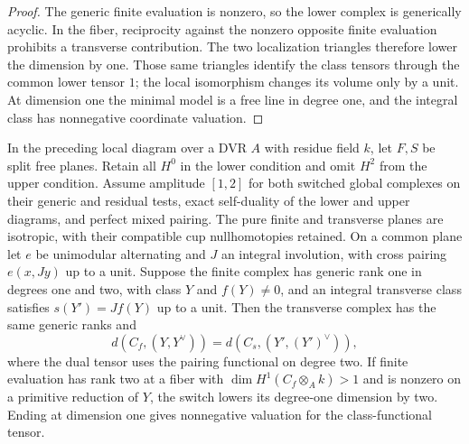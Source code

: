 \begin{proof}
The generic finite evaluation is nonzero, so the lower complex is
generically acyclic.  In the fiber, reciprocity against the nonzero
opposite finite evaluation prohibits a transverse contribution.
The two localization triangles therefore lower the dimension by one.
Those same triangles identify the class tensors through the common
lower tensor $1$; the local isomorphism changes its volume only by a
unit.  At dimension one the minimal model is a free line in degree
one, and the integral class has nonnegative coordinate valuation.
\end{proof}

\begin{lemma}\label{models:square-switch}
In the preceding local diagram over a DVR $A$ with residue field
$k$, let $F,S$ be split free planes.  Retain all $H^0$ in the lower
condition and omit $H^2$ from the upper condition.  Assume amplitude
$[1,2]$ for both switched global complexes on their generic and
residual tests, exact self-duality of the lower and upper diagrams,
and perfect mixed pairing.  The pure finite and transverse planes
are isotropic, with their compatible cup nullhomotopies retained.
On a common plane let $e$ be unimodular
alternating and $J$ an integral involution, with cross pairing
$e(x,Jy)$ up to a unit.  Suppose the finite complex has generic rank
one in degrees one and two, with class $Y$ and $f(Y)\ne0$, and an
integral transverse class satisfies $s(Y')=Jf(Y)$ up to a unit.  Then
the transverse complex has the same generic ranks and
\[
 d(C_f,(Y,Y^\vee))=d(C_s,(Y',(Y')^\vee)),
\]
where the dual tensor uses the pairing functional on degree two.
If finite evaluation has rank two at a fiber with
$\dim H^1(C_f\otimes_A k)>1$ and is nonzero
on a primitive reduction of $Y$, the switch lowers its degree-one
dimension by two.  Ending at dimension one gives nonnegative
valuation for the class-functional tensor.
\end{lemma}

